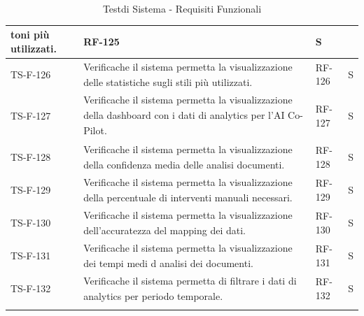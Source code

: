 \documentclass[a4paper,11pt]{article}
\renewcommand{\G}{\texorpdfstring{\textsubscript{\scalebox{0.6}{\textbf{G}}}\xspace}{ G}}
\begin{document}
\begin{longtable}{|p{2.2cm}|p{8.3cm}|p{2cm}|p{1.5cm}|}
toni più utilizzati. & RF-125 & S \\ \hline
TS-F-126 & Verifica\G che il sistema permetta la visualizzazione delle statistiche
sugli stili più utilizzati. & RF-126 & S \\ \hline
TS-F-127 & Verifica\G che il sistema permetta la visualizzazione della dashboard\G
con i dati di analytics per l’AI Co-Pilot\G. & RF-127 & S \\ \hline
TS-F-128 & Verifica\G che il sistema permetta la visualizzazione della confidenza
media delle analisi documenti. & RF-128 & S \\ \hline
TS-F-129 & Verifica\G che il sistema permetta la visualizzazione della percentuale di
interventi manuali necessari. & RF-129 & S \\ \hline
TS-F-130 & Verifica\G che il sistema permetta la visualizzazione dell’accuratezza del
mapping dei dati. & RF-130 & S \\ \hline
TS-F-131 & Verifica\G che il sistema permetta la visualizzazione dei tempi medi d
analisi dei documenti. & RF-131 & S \\ \hline
TS-F-132 & Verifica\G che il sistema permetta di filtrare i dati
di analytics per periodo temporale. & RF-132 & S \\ \hline

\caption{Test\G di Sistema - Requisiti Funzionali}
\label{tab:test-sistema-funzionali}
\end{longtable}
\end{document}
